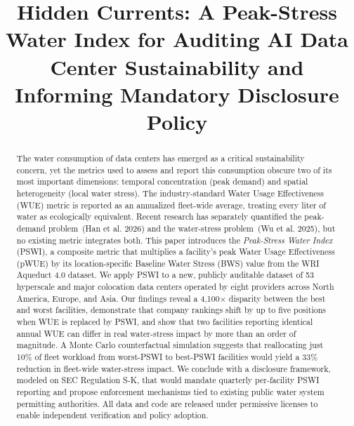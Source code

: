 \documentclass[conference,10pt]{IEEEtran}
\begin{document}

\title{Hidden Currents: A Peak-Stress Water Index for Auditing AI Data Center Sustainability and Informing Mandatory Disclosure Policy}

\author{
}

\maketitle

\begin{abstract}
The water consumption of data centers has emerged as a critical
sustainability concern, yet the metrics used to assess and report this
consumption obscure two of its most important dimensions: temporal
concentration (peak demand) and spatial heterogeneity (local water
stress). The industry-standard Water Usage Effectiveness (WUE) metric is
reported as an annualized fleet-wide average, treating every liter of
water as ecologically equivalent. Recent research has separately
quantified the peak-demand problem~(Han et al. 2026) and the
water-stress problem~(Wu et al. 2025), but no existing metric integrates
both. This paper introduces the \emph{Peak-Stress Water Index} (PSWI), a
composite metric that multiplies a facility's peak Water Usage
Effectiveness (pWUE) by its location-specific Baseline Water Stress
(BWS) value from the WRI Aqueduct 4.0 dataset. We apply PSWI to a new,
publicly auditable dataset of 53 hyperscale and major colocation data
centers operated by eight providers across North America, Europe, and
Asia. Our findings reveal a 4{,}100$\times$ disparity between the best
and worst facilities, demonstrate that company rankings shift by up to
five positions when WUE is replaced by PSWI, and show that two
facilities reporting identical annual WUE can differ in real
water-stress impact by more than an order of magnitude. A Monte Carlo
counterfactual simulation suggests that reallocating just 10\% of fleet
workload from worst-PSWI to best-PSWI facilities would yield a 33\%
reduction in fleet-wide water-stress impact. We conclude with a
disclosure framework, modeled on SEC Regulation S-K, that would mandate
quarterly per-facility PSWI reporting and propose enforcement
mechanisms tied to existing public water system permitting authorities.
All data and code are released under permissive licenses to enable
independent verification and policy adoption.
\end{abstract}
\end{document}
